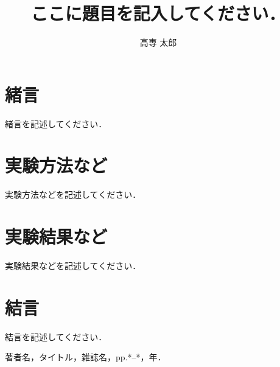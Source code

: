 \documentclass{advanced}
\title{ここに題目を記入してください．}
\author{高専 太郎}
\begin{document}
	\maketitle

	\section{緒言}

		緒言を記述してください．

	\section{実験方法など}

		実験方法などを記述してください．

	\section{実験結果など}

		実験結果などを記述してください．

	\section{結言}

		結言を記述してください．

	\begin{thebibliography}{99}
		著者名，タイトル，雑誌名，pp.*--*，年．
	\end{thebibliography}
\end{document}
